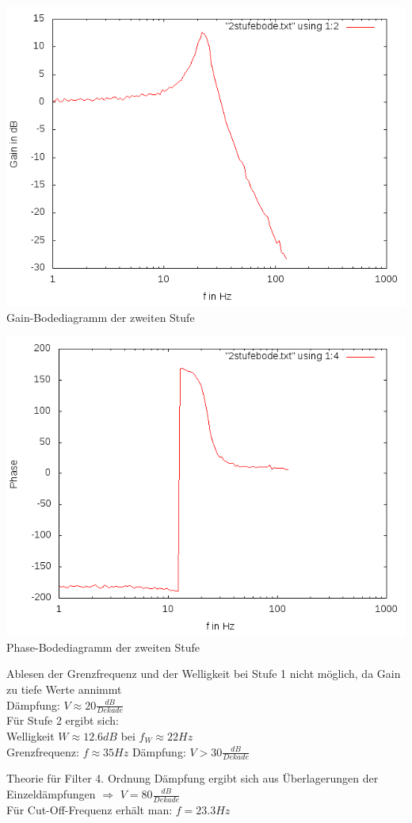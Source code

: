 \documentclass[compress,11pt]{beamer}
\begin{document}
\begin{frame}
\includegraphics[width=.7\textwidth]{4aufgabe/2stufegain}\\
Gain-Bodediagramm der zweiten Stufe
\end{frame}
\begin{frame}
\includegraphics[width=.7\textwidth]{4aufgabe/2stufephase}\\
Phase-Bodediagramm der zweiten Stufe
\end{frame}
\begin{frame}
Ablesen der Grenzfrequenz und der Welligkeit bei Stufe 1 nicht möglich, da Gain zu tiefe Werte annimmt\\
Dämpfung: $V \approx 20 \frac{dB}{Dekade}$\\
Für Stufe 2 ergibt sich:\\
Welligkeit $W \approx 12.6 dB$ bei $f_W \approx	22 Hz$\\
Grenzfrequenz: $f \approx 35 Hz$
Dämpfung: $V > 30 \frac{dB}{Dekade}$



\end{frame}
\begin{frame}
\begin{block}{Theorie für Filter 4. Ordnung}
Dämpfung ergibt sich aus Überlagerungen der Einzeldämpfungen
$\Rightarrow$ $V = 80 \frac{dB}{Dekade}$\\
Für Cut-Off-Frequenz erhält man: $f = 23.3 Hz$
\end{block}
\end{frame}
\end{document}
